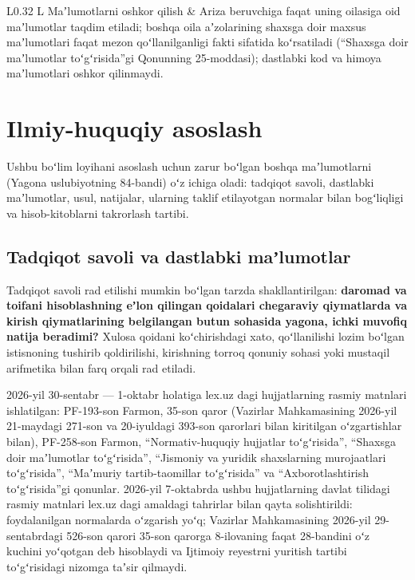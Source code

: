 \documentclass[14pt,a4paper]{extarticle}
\begin{document}
\begin{longtable}{L{0.32\linewidth} L{\tabcolsep}}
Maʼlumotlarni oshkor qilish & Ariza beruvchiga faqat uning oilasiga oid maʼlumotlar taqdim etiladi; boshqa oila aʼzolarining shaxsga doir maxsus maʼlumotlari faqat mezon qoʻllanilganligi fakti sifatida koʻrsatiladi (“Shaxsga doir maʼlumotlar toʻgʻrisida”gi Qonunning 25-moddasi); dastlabki kod va himoya maʼlumotlari oshkor qilinmaydi.\\
\bottomrule
\end{longtable}\endgroup

\section{Ilmiy-huquqiy asoslash}\label{sec:sci}
Ushbu boʻlim loyihani asoslash uchun zarur boʻlgan boshqa maʼlumotlarni (Yagona uslubiyotning 84-bandi) oʻz ichiga oladi: tadqiqot savoli, dastlabki maʼlumotlar, usul, natijalar, ularning taklif etilayotgan normalar bilan bogʻliqligi va hisob-kitoblarni takrorlash tartibi.

\subsection{Tadqiqot savoli va dastlabki maʼlumotlar}
Tadqiqot savoli rad etilishi mumkin boʻlgan tarzda shakllantirilgan: \textbf{daromad va toifani hisoblashning eʼlon qilingan qoidalari chegaraviy qiymatlarda va kirish qiymatlarining belgilangan butun sohasida yagona, ichki muvofiq natija beradimi?} Xulosa qoidani koʻchirishdagi xato, qoʻllanilishi lozim boʻlgan istisnoning tushirib qoldirilishi, kirishning torroq qonuniy sohasi yoki mustaqil arifmetika bilan farq orqali rad etiladi.

2026-yil 30-sentabr — 1-oktabr holatiga lex.uz dagi hujjatlarning rasmiy matnlari ishlatilgan: PF-193-son Farmon, 35-son qaror (Vazirlar Mahkamasining 2026-yil 21-maydagi 271-son va 20-iyuldagi 393-son qarorlari bilan kiritilgan oʻzgartishlar bilan), PF-258-son Farmon, “Normativ-huquqiy hujjatlar toʻgʻrisida”, “Shaxsga doir maʼlumotlar toʻgʻrisida”, “Jismoniy va yuridik shaxslarning murojaatlari toʻgʻrisida”, “Maʼmuriy tartib-taomillar toʻgʻrisida” va “Axborotlashtirish toʻgʻrisida”gi qonunlar\cite{pf193,res35,pf258,orq682,pdlaw,appeals,apl,inform}. 2026-yil 7-oktabrda ushbu hujjatlarning davlat tilidagi rasmiy matnlari lex.uz dagi amaldagi tahrirlar bilan qayta solishtirildi: foydalanilgan normalarda oʻzgarish yoʻq; Vazirlar Mahkamasining 2026-yil 29-sentabrdagi 526-son qarori 35-son qarorga 8-ilovaning faqat 28-bandini oʻz kuchini yoʻqotgan deb hisoblaydi va Ijtimoiy reyestrni yuritish tartibi toʻgʻrisidagi nizomga taʼsir qilmaydi.
\end{document}

